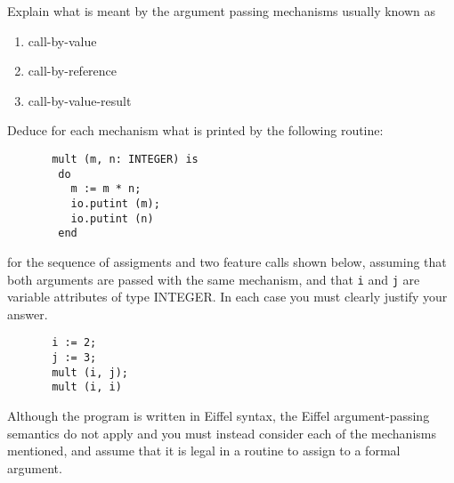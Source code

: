 \begin{questions}
\begin{subquestions}
        Explain what is meant by the argument passing mechanisms usually
        known as
                \begin{enumerate}
                \item call-by-value
                \item call-by-reference
                \item call-by-value-result
                \end{enumerate}
        Deduce for each mechanism what is printed by the 
	following routine:
\begin{verbatim}
       mult (m, n: INTEGER) is
        do
          m := m * n;
          io.putint (m);
          io.putint (n)
        end
\end{verbatim}   
	for the sequence of assigments and two feature calls
        shown below, assuming that both arguments are
	passed with the same mechanism, and that \verb"i" and
	\verb"j" are variable attributes of type INTEGER.
        In each case you must clearly justify your answer.
\begin{verbatim}
       i := 2;
       j := 3;
       mult (i, j);
       mult (i, i)
\end{verbatim}
Although the program is written in Eiffel syntax, the Eiffel
argument-passing semantics do not apply and you must
instead consider each of the mechanisms mentioned, and assume
that it is legal in a routine to assign to a formal argument.

\end{subquestions}
\end{questions}



